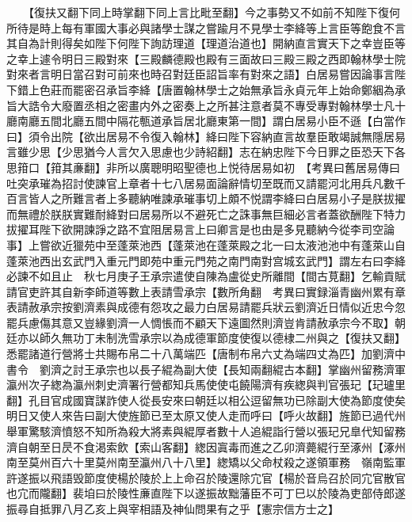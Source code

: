 　　【復扶又翻下同上時掌翻下同上言比毗至翻】今之事勢又不如前不知陛下復何所待是時上每有軍國大事必與諸學士謀之嘗踰月不見學士李絳等上言臣等飽食不言其自為計則得矣如陛下何陛下詢訪理道【理道治道也】開納直言實天下之幸豈臣等之幸上遽令明日三殿對來【三殿麟德殿也殿有三面故曰三殿三殿之西即翰林學士院對來者言明日當召對可前來也時召對廷臣詔旨率有對來之語】白居易嘗因論事言陛下錯上色莊而罷密召承旨李絳【唐置翰林學士之始無承旨永貞元年上始命鄭絪為承旨大誥令大廢置丞相之密畫内外之密奏上之所甚注意者莫不專受專對翰林學士凡十廳南廳五間北廳五間中隔花甎道承旨居北廳東第一間】謂白居易小臣不遜【白當作曰】須令出院【欲出居易不令復入翰林】絳曰陛下容納直言故羣臣敢竭誠無隱居易言雖少思【少思猶今人言欠入思慮也少詩紹翻】志在納忠陛下今日罪之臣恐天下各思箝口【箝其亷翻】非所以廣聰明昭聖德也上悦待居易如初　【考異曰舊居易傳曰吐突承璀為招討使諫官上章者十七八居易面論辭情切至既而又請罷河北用兵凡數千百言皆人之所難言者上多聽納唯諫承璀事切上頗不悦謂李絳曰白居易小子是朕拔擢而無禮於朕朕實難耐絳對曰居易所以不避死亡之誅事無巨細必言者蓋欲酬陛下特力拔擢耳陛下欲開諫諍之路不宜阻居易言上曰卿言是也由是多見聽納今從李司空論事】上嘗欲近獵苑中至蓬萊池西【蓬萊池在蓬萊殿之北一曰太液池池中有蓬萊山自蓬萊池西出玄武門入重元門即苑中重元門苑之南門南對宫城玄武門】謂左右曰李絳必諫不如且止　秋七月庚子王承宗遣使自陳為盧從史所離間【間古莧翻】乞輸貢賦請官吏許其自新李師道等數上表請雪承宗【數所角翻　考異曰實録淄青幽州累有章表請赦承宗按劉濟素與成德有怨攻之最力白居易請罷兵狀云劉濟近日情似近忠今忽罷兵慮傷其意又豈緣劉濟一人惆悵而不顧天下遠圖然則濟豈肯請赦承宗今不取】朝廷亦以師久無功丁未制洗雪承宗以為成德軍節度使復以德棣二州與之【復扶又翻】悉罷諸道行營將士共賜布帛二十八萬端匹【唐制布帛六丈為端四丈為匹】加劉濟中書令　劉濟之討王承宗也以長子緄為副大使【長知兩翻緄古本翻】掌幽州留務濟軍瀛州次子緫為瀛州刺史濟署行營都知兵馬使使屯饒陽濟有疾緫與判官張玘【玘瓐里翻】孔目官成國寶謀詐使人從長安來曰朝廷以相公逗留無功已除副大使為節度使矣明日又使人來告曰副大使旌節已至太原又使人走而呼曰【呼火故翻】旌節已過代州舉軍驚駭濟憤怒不知所為殺大將素與緄厚者數十人追緄詣行營以張玘兄臯代知留務濟自朝至日昃不食渇索飲【索山客翻】緫因寘毒而進之乙卯濟薨緄行至涿州【涿州南至莫州百六十里莫州南至瀛州八十八里】緫矯以父命杖殺之遂領軍務　嶺南監軍許遂振以飛語毁節度使楊於陵於上上命召於陵還除宂官【楊於音烏召於同宂官散官也宂而隴翻】裴垍曰於陵性亷直陛下以遂振故黜藩臣不可丁巳以於陵為吏部侍郎遂振尋自抵罪八月乙亥上與宰相語及神仙問果有之乎【憲宗信方士之】

